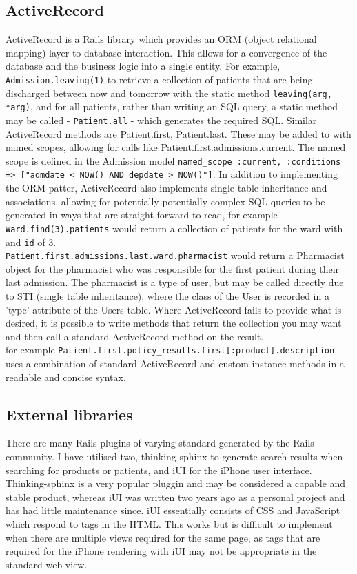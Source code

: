 \documentclass[letterpaper]{amsart}
\begin{document}
\subsection{ActiveRecord}
ActiveRecord is a Rails library which provides an ORM (object relational mapping) layer to database interaction.  This allows for a convergence of the database and the business logic into a single entity.  For example, \texttt{Admission.leaving(1)} to retrieve a collection of patients that are being discharged between now and tomorrow with the static method \texttt{leaving(arg, *arg)}, and for all patients, rather than writing an SQL query, a static method may be called - \texttt{Patient.all} - which generates the required SQL. Similar ActiveRecord methods are Patient.first, Patient.last.  These may be added to with named scopes, allowing for calls like Patient.first.admissions.current.  The named scope is defined in the Admission model \texttt{named\_scope :current, :conditions =>  ["admdate <  NOW() AND depdate > NOW()"]}.  In addition to implementing the ORM patter, ActiveRecord also implements single table inheritance and associations, allowing for potentially potentially complex SQL queries to be generated in ways that are straight forward to read, for example \texttt{Ward.find(3).patients} would return a collection of patients for the ward with and \texttt{id} of 3.\\ \texttt{Patient.first.admissions.last.ward.pharmacist} would return a Pharmacist object for the pharmacist who was responsible for the first patient during their last admission.  The pharmacist is a type of user, but may be called directly due to STI (single table inheritance), where the class of the User is recorded in a 'type' attribute of the Users table.  Where ActiveRecord fails to provide what is desired, it is possible to write methods that return the collection you may want and then call a standard ActiveRecord method on the result.\\ for example \texttt{Patient.first.policy\_results.first[:product].description} uses a combination of standard ActiveRecord and custom instance methods in a readable and concise syntax.
\subsection{External libraries}
There are many Rails plugins of varying standard generated by the Rails community.  I have utilised two, thinking-sphinx to generate search results when searching for products or patients, and iUI for the iPhone user interface. Thinking-sphinx is a very popular pluggin and may be considered a capable and stable product, whereas iUI was written two years ago as a personal project and has had little maintenance since. iUI essentially consists of CSS and JavaScript which respond to tags in the HTML.  This works but is difficult to implement when there are multiple views required for the same page, as tags that are required for the iPhone rendering with iUI may not be appropriate in the standard web view.
\end{document}
